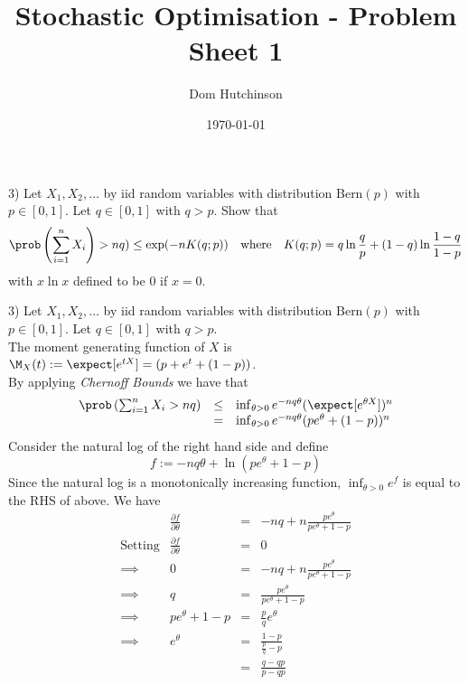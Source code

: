 \documentclass[11pt,a4paper]{article}
\begin{document}
\questionsfalse

\title{Stochastic Optimisation - Problem Sheet 1}
\author{Dom Hutchinson}
\date{\today}
\maketitle


\begin{question}{3)}
  Let $X_1,X_2,\dots$ by iid random variables with distribution $\text{Bern}(p)$ with $p\in[0,1]$. Let $q\in[0,1]$ with $q>p$. Show that
  \[ \prob\left(\sum_{i=1}^nX_i\right)>nq)\leq\text{exp}(-nK(q;p))\quad\text{where}\quad K(q;p)=q\ln\frac{q}p+(1-q)\ln\frac{1-q}{1-p} \]
  with $x\ln x$ defined to be $0$ if $x=0$.
\end{question}

\begin{answer}{3)}
  Let $X_1,X_2,\dots$ by iid random variables with distribution $\text{Bern}(p)$ with $p\in[0,1]$. Let $q\in[0,1]$ with $q>p$.\\
  The moment generating function of $X$ is $\M_X(t):=\expect[e^{tX}]=(p+e^t+(1-p))$.\\
  By applying \textit{Chernoff Bounds} we have that
  \[\begin{array}{rcl}
    \prob\left(\sum_{i=1}^nX_i>nq\right)&\leq&\inf_{\theta>0}e^{-nq\theta}(\expect[e^{\theta X}])^n\\
    &=&\inf_{\theta>0}e^{-nq\theta}(pe^\theta+(1-p))^n
  \end{array}\]
  Consider the natural log of the right hand side and define \[f:=-nq\theta+\ln(pe^\theta+1-p) \]
  Since the natural log is a monotonically increasing function, $\inf_{\theta>0}e^f$ is equal to the RHS of above.
  We have
  \[\begin{array}{rrcl}
    &\frac{\partial f}{\partial\theta}&=&-nq+n\frac{pe^\theta}{pe^\theta+1-p}\\
    \text{Setting}&\frac{\partial f}{\partial\theta}&=&0\\
    \implies&0&=&-nq+n\frac{pe^\theta}{pe^\theta+1-p}\\
    \implies&q&=&\frac{pe^\theta}{pe^\theta+1-p}\\
    \implies&pe^\theta+1-p&=&\frac{p}qe^\theta\\
    \implies&e^\theta&=&\frac{1-p}{\frac{p}q-p}\\
    &&=&\frac{q-qp}{p-qp}\\

\end{array}\]
\end{answer}
\end{document}
